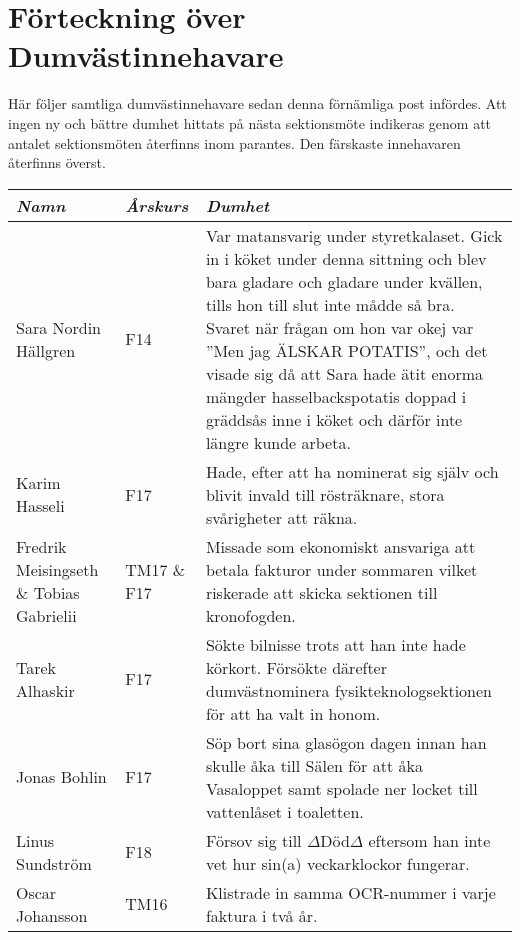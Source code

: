 
\section{Förteckning över Dumvästinnehavare}

\label{dumvast}

Här följer samtliga dumvästinnehavare sedan denna förnämliga post
infördes. Att ingen ny och bättre dumhet hittats på nästa sektionsmöte
indikeras genom att antalet sektionsmöten återfinns inom parantes. Den
färskaste innehavaren återfinns överst.

\begin{longtable}{p{55mm}lp{60mm}}
  \emph{Namn} & \emph{Årskurs} & \emph{Dumhet}\\ \hline
  
   Sara Nordin Hällgren & F14 & Var matansvarig under styretkalaset. Gick in i köket under denna sittning och blev bara gladare och gladare under kvällen, tills hon till slut inte mådde så bra. Svaret när
frågan om hon var okej var ”Men jag ÄLSKAR POTATIS”, och det visade sig då att Sara hade ätit
enorma mängder hasselbackspotatis doppad i gräddsås inne i köket och därför inte längre kunde
arbeta.
  \\ \hline
  
   Karim Hasseli & F17 & Hade, efter att ha nominerat sig själv och blivit invald till rösträknare, stora svårigheter att räkna.
  \\ \hline
  
  Fredrik Meisingseth \& Tobias Gabrielii & TM17 \& F17 & Missade som ekonomiskt ansvariga att betala fakturor under sommaren vilket riskerade att skicka sektionen till kronofogden.
 \\ \hline
  
  Tarek Alhaskir & F17 & Sökte bilnisse trots att han inte hade körkort. Försökte därefter dumvästnominera fysikteknologsektionen för att ha valt in honom. 
  \\ \hline
  
  Jonas Bohlin & F17 & Söp bort sina glasögon dagen innan han skulle åka till Sälen för att åka Vasaloppet samt spolade ner locket till vattenlåset i toaletten. \\ \hline
  
  Linus Sundström & F18 & Försov sig till $\Delta$Död$\Delta$ eftersom han inte vet hur sin(a) veckarklockor fungerar. \\ \hline
  
  Oscar Johansson & TM16 & Klistrade in samma OCR-nummer i varje faktura i två år. \\ \hline
  

\end{longtable}
